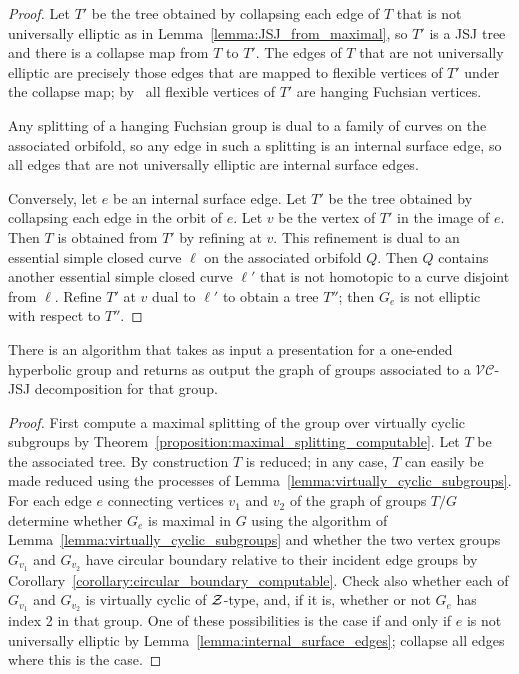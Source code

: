 \begin{proof} 
Let $T'$ be the tree obtained by collapsing each edge of $T$ that is not universally elliptic as in Lemma~\ref{lemma:JSJ_from_maximal}, so $T'$ is a JSJ tree and there is a collapse map from $T$ to $T'$. 
The edges of $T$ that are not universally elliptic are precisely those edges that are mapped to flexible vertices of $T'$ under the collapse map; by~\cite[Theorem 6.2]{guirardellevitt17} all flexible vertices of $T'$ are hanging Fuchsian vertices. 

Any splitting of a hanging Fuchsian group is dual to a family of curves on the associated orbifold, so any edge in such a splitting is an internal surface edge, so all edges that are not universally elliptic are internal surface edges.

Conversely, let $e$ be an internal surface edge. 
Let $T'$ be the tree obtained by collapsing each edge in the orbit of $e$.
Let $v$ be the vertex of $T'$ in the image of $e$. 
Then $T$ is obtained from $T'$ by refining at $v$. 
This refinement is dual to an essential simple closed curve $\ell$ on the associated orbifold $Q$. 
Then $Q$ contains another essential simple closed curve $\ell'$ that is not homotopic to a curve disjoint from $\ell$. 
Refine $T'$ at $v$ dual to $\ell'$ to obtain a tree $T''$; then $G_e$ is not elliptic with respect to $T''$.
\end{proof}

\begin{theorem}\label{theoremm:VC-JSJ_computable} 
    There is an algorithm that takes as input a presentation for a one-ended hyperbolic group and returns as output the graph of groups associated to a $\mathcal{VC}$-JSJ decomposition for that group.
\end{theorem}

\begin{proof} 
    First compute a maximal splitting of the group over virtually cyclic subgroups by Theorem~\ref{proposition:maximal_splitting_computable}. 
    Let $T$ be the associated tree. 
    By construction $T$ is reduced; in any case, $T$ can easily be made reduced using the processes of Lemma~\ref{lemma:virtually_cyclic_subgroups}. 
    For each edge $e$ connecting vertices $v_1$ and $v_2$ of the graph of groups $T/ G$ determine whether $G_e$ is maximal in $G$ using the algorithm of Lemma~\ref{lemma:virtually_cyclic_subgroups} and whether the two vertex groups $G_{v_1}$ and $G_{v_2}$ have circular boundary relative to their incident edge groups by Corollary~\ref{corollary:circular_boundary_computable}. 
    Check also whether each of $G_{v_1}$ and $G_{v_2}$ is virtually cyclic of $\mathcal{Z}$-type, and, if it is, whether or not $G_e$ has index 2{} in that group. 
    One of these possibilities is the case if and only if $e$ is not universally elliptic by Lemma~\ref{lemma:internal_surface_edges}; collapse all edges where this is the case.
\end{proof}

